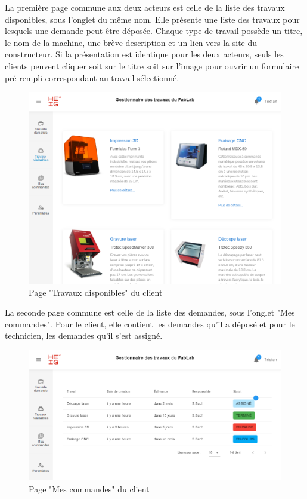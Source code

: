 \documentclass[
    iai, %
    eai, %
]{heig-tb}
\begin{document}
\newpage
La première page commune aux deux acteurs est celle de la liste des travaux disponibles, sous l'onglet du même nom. Elle présente une liste des travaux pour lesquels une demande peut être déposée.
Chaque type de travail possède un titre, le nom de la machine, une brève description et un lien vers la site du constructeur. Si la présentation est identique pour les deux acteurs, seuls les clients peuvent cliquer soit sur le titre soit sur l'image pour ouvrir un formulaire pré-rempli correspondant au travail sélectionné.

\begin{figure}[h]
  \includegraphics[width=14cm]{ui_joblist_page.PNG}
  \caption{Page "Travaux disponibles" du client}
\end{figure}

La seconde page commune est celle de la liste des demandes, sous l'onglet "Mes commandes". Pour le client, elle contient les demandes qu'il a déposé et pour le technicien, les demandes qu'il s'est assigné.

\begin{figure}[h]
  \includegraphics[width=14cm]{ui_myjobs_client.PNG}
  \caption{Page "Mes commandes" du client}
\end{figure}
\end{document}
